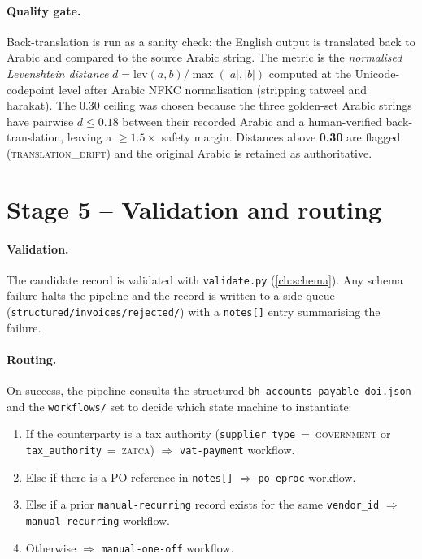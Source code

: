 \documentclass[11pt,a4paper,twoside]{report}
\begin{document}
\paragraph{Quality gate.} Back-translation is run as a sanity check:
the English output is translated back to Arabic and compared to the
source Arabic string. The metric is the \emph{normalised Levenshtein
distance} $d = \mathrm{lev}(a, b) / \max(|a|, |b|)$ computed at the
Unicode-codepoint level after Arabic NFKC normalisation (stripping
tatweel and harakat). The 0.30 ceiling was chosen because the three
golden-set Arabic strings have pairwise $d \leq 0.18$ between their
recorded Arabic and a human-verified back-translation, leaving a
$\geq 1.5\times$ safety margin. Distances above \textbf{0.30} are
flagged (\textsc{translation\_drift}) and the original Arabic is
retained as authoritative.

\section{Stage 5 -- Validation and routing}

\paragraph{Validation.} The candidate record is validated with
\texttt{validate.py} (\cref{ch:schema}). Any schema failure halts the
pipeline and the record is written to a side-queue
(\texttt{structured/invoices/rejected/}) with a \texttt{notes[]} entry
summarising the failure.

\paragraph{Routing.} On success, the pipeline consults the structured
\texttt{bh-accounts-payable-doi.json} and the \texttt{workflows/} set
to decide which state machine to instantiate:

\begin{enumerate}
  \item If the counterparty is a tax authority
        (\texttt{supplier\_type}~=~\textsc{government} or
         \texttt{tax\_authority}~=~\textsc{zatca})
        $\Rightarrow$ \texttt{vat-payment} workflow.
  \item Else if there is a PO reference in \texttt{notes[]}
        $\Rightarrow$ \texttt{po-eproc} workflow.
  \item Else if a prior \texttt{manual-recurring} record exists for
        the same \texttt{vendor\_id}
        $\Rightarrow$ \texttt{manual-recurring} workflow.
  \item Otherwise $\Rightarrow$ \texttt{manual-one-off} workflow.
\end{enumerate}
\end{document}
